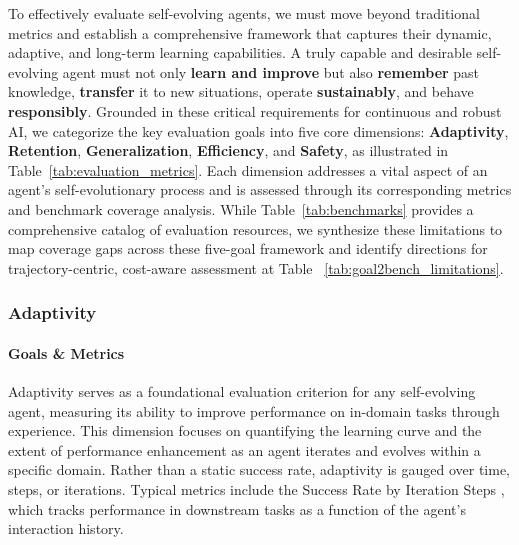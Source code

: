 \documentclass[10pt]{article} %
\begin{document}
To effectively evaluate self-evolving agents, we must move beyond traditional metrics and establish a comprehensive framework that captures their dynamic, adaptive, and long-term learning capabilities. A truly capable and desirable self-evolving agent must not only \textbf{learn and improve} but also \textbf{remember} past knowledge, \textbf{transfer} it to new situations, operate \textbf{sustainably}, and behave \textbf{responsibly}. Grounded in these critical requirements for continuous and robust AI, we categorize the key evaluation goals into five core dimensions: \textbf{Adaptivity}, \textbf{Retention}, \textbf{Generalization}, \textbf{Efficiency}, and \textbf{Safety}, as illustrated in Table~\ref{tab:evaluation_metrics}. Each dimension addresses a vital aspect of an agent’s self-evolutionary process and is assessed through its corresponding metrics and benchmark coverage analysis.
While Table~\ref{tab:benchmarks} provides a comprehensive catalog of evaluation resources, we synthesize these limitations to map coverage gaps across these five-goal framework and identify directions for trajectory-centric, cost-aware assessment at  Table ~\ref{tab:goal2bench_limitations}.


\subsubsection{Adaptivity}
\paragraph{Goals \& Metrics} Adaptivity serves as a foundational evaluation criterion for any self-evolving agent, measuring its ability to improve performance on in-domain tasks through experience. This dimension focuses on quantifying the learning curve and the extent of performance enhancement as an agent iterates and evolves within a specific domain. Rather than a static success rate, adaptivity is gauged over time, steps, or iterations. 
Typical metrics include the Success Rate by Iteration Steps \citep{hu2024automated, wang2024agent, zheng2025lifelongagentbench}, which tracks performance in downstream tasks as a function of the agent's interaction history. 
\end{document}
